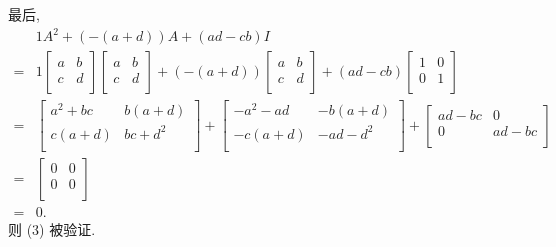 \documentclass[../libro.tex]{subfiles}
\begin{document}
\begin{example}
    最后,
    \begin{align*}
        &
        1 A^2 + (-(a + d)) A + (ad - cb) I
        \\
        = {} &
        1
        \begin{bmatrix}
            a & b \\
            c & d \\
        \end{bmatrix}
        \begin{bmatrix}
            a & b \\
            c & d \\
        \end{bmatrix}
        + (-(a + d))
        \begin{bmatrix}
            a & b \\
            c & d \\
        \end{bmatrix}
        + (ad - cb)
        \begin{bmatrix}
            1 & 0 \\
            0 & 1 \\
        \end{bmatrix}
        \\
        = {} &
        \begin{bmatrix}
            a^2 + bc & b(a + d) \\
            c(a + d) & bc + d^2 \\
        \end{bmatrix}
        +
        \begin{bmatrix}
            -a^2 - ad & -b(a + d) \\
            -c(a + d) & -ad - d^2 \\
        \end{bmatrix}
        +
        \begin{bmatrix}
            ad - bc & 0       \\
            0       & ad - bc \\
        \end{bmatrix}
        \\
        = {} &
        \begin{bmatrix}
            0 & 0 \\
            0 & 0 \\
        \end{bmatrix}
        \\
        = {} &
        0.
    \end{align*}
    则 (3) 被验证.
\end{example}
\end{document}
